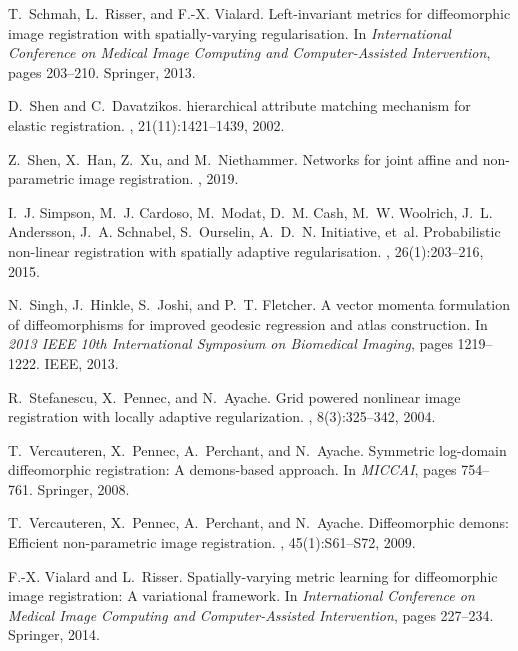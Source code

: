 \documentclass{article}
\numberwithin{equation}{section}
\begin{document}
{\begin{thebibliography}{10}
T.~Schmah, L.~Risser, and F.-X. Vialard.
\newblock Left-invariant metrics for diffeomorphic image registration with
  spatially-varying regularisation.
\newblock In {\em International Conference on Medical Image Computing and
  Computer-Assisted Intervention}, pages 203--210. Springer, 2013.

D.~Shen and C.~Davatzikos.
 hierarchical attribute matching mechanism for elastic
  registration.
, 21(11):1421--1439, 2002.

Z.~Shen, X.~Han, Z.~Xu, and M.~Niethammer.
\newblock Networks for joint affine and non-parametric image registration.
, 2019.

I.~J. Simpson, M.~J. Cardoso, M.~Modat, D.~M. Cash, M.~W. Woolrich, J.~L.
  Andersson, J.~A. Schnabel, S.~Ourselin, A.~D.~N. Initiative, et~al.
\newblock Probabilistic non-linear registration with spatially adaptive
  regularisation.
, 26(1):203--216, 2015.

N.~Singh, J.~Hinkle, S.~Joshi, and P.~T. Fletcher.
\newblock A vector momenta formulation of diffeomorphisms for improved geodesic
  regression and atlas construction.
\newblock In {\em 2013 IEEE 10th International Symposium on Biomedical
  Imaging}, pages 1219--1222. IEEE, 2013.

R.~Stefanescu, X.~Pennec, and N.~Ayache.
\newblock Grid powered nonlinear image registration with locally adaptive
  regularization.
, 8(3):325--342, 2004.

T.~Vercauteren, X.~Pennec, A.~Perchant, and N.~Ayache.
\newblock Symmetric log-domain diffeomorphic registration: A demons-based
  approach.
\newblock In {\em MICCAI}, pages 754--761. Springer, 2008.

T.~Vercauteren, X.~Pennec, A.~Perchant, and N.~Ayache.
\newblock Diffeomorphic demons: Efficient non-parametric image registration.
, 45(1):S61--S72, 2009.

F.-X. Vialard and L.~Risser.
\newblock Spatially-varying metric learning for diffeomorphic image
  registration: A variational framework.
\newblock In {\em International Conference on Medical Image Computing and
  Computer-Assisted Intervention}, pages 227--234. Springer, 2014.


\end{thebibliography}}
\end{document}
